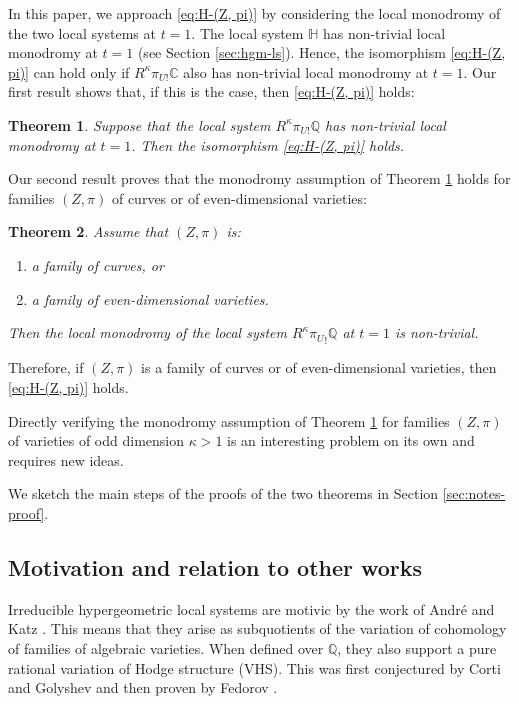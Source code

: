 \documentclass[11pt, reqno]{amsart}
\theoremstyle{plain}
\newtheorem{thm}{Theorem}[section]
\theoremstyle{definition}
\newcommand{\CC}{\mathbb{C}}
\newcommand{\QQ}{\mathbb{Q}}
\newcommand{\HH}{\mathbb{H}}
\begin{document}
In this paper, we approach \eqref{eq:H-(Z, pi)} by considering the local monodromy of the two local systems at $t=1$.
The local system $\HH$ has non-trivial local monodromy at $t=1$ (see Section \ref{sec:hgm-ls}). Hence, the isomorphism \eqref{eq:H-(Z, pi)} can hold only if $R^\kappa \pi_{U !}  \CC$ also has non-trivial local monodromy at $t=1$. 
Our first result shows that, if this is the case, then \eqref{eq:H-(Z, pi)} holds: 
\begin{thm}
\label{thm:non-trivial-isomorphism}
Suppose that the local system $R^\kappa \pi_{U !} \QQ$ has non-trivial local monodromy at $t=1$. 
Then the isomorphism \eqref{eq:H-(Z, pi)}
holds.
\end{thm}





Our second result proves that the monodromy assumption of Theorem \ref{thm:non-trivial-isomorphism} holds for families  $(Z, \pi)$ of curves or of even-dimensional varieties: 
 
\begin{thm}
\label{thm:curves-even}
Assume that $(Z, \pi)$ is:
\begin{enumerate}
    \item a family of curves, or
    \item a family of even-dimensional varieties.
    \end{enumerate}
    Then the local monodromy of the local system $R^{\kappa} {\pi_U}_{ !}  \QQ$ at $t=1$ is non-trivial. 
\end{thm}
Therefore, if $(Z, \pi)$ is a family of curves or of even-dimensional varieties, then \eqref{eq:H-(Z, pi)} holds.

Directly verifying the monodromy assumption of Theorem \ref{thm:non-trivial-isomorphism} for families $(Z, \pi)$ of varieties of odd dimension $\kappa>1$ is an interesting problem on its own and requires new ideas.

We sketch the main steps of the proofs of the two theorems in Section \ref{sec:notes-proof}. 

\subsection{Motivation and relation to other works} \label{sec:motivation-works}
Irreducible hypergeometric local systems are motivic by the work of André and Katz \cite{Andre-G-functions, Katz}. 
This means that they arise as subquotients of the variation of cohomology of families of algebraic varieties.
When defined over $\QQ$, they also support a pure rational variation of Hodge structure (VHS). 
This was first conjectured by Corti and Golyshev \cite{AG} and then proven by Fedorov \cite{Fedorov}.
\end{document}
